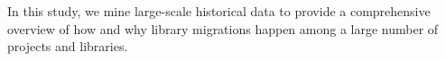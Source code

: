 \documentclass[sigconf, screen]{acmart}
\begin{document}
In this study, we mine large-scale historical data to provide a comprehensive overview of how and why library migrations happen among a large number of projects and libraries.
\end{document}
